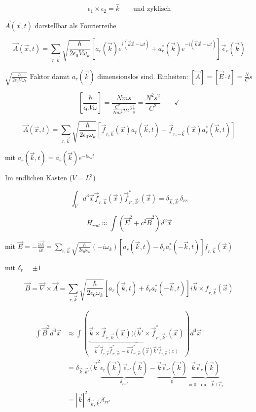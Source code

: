 \[  \epsilon_1  \times \epsilon_2 = \hat k \qquad \text{und zyklisch}\]

\(\vec A(\vec x,t)\) darstellbar als Fourierreihe

\[\vec A(\vec x,t) = \sum_{r,\vec k}\sqrt{ \frac{\hbar}{2\epsilon_0 V\omega_k}}\left[ a_r(\vec k) e^{i(\vec k\vec x-\omega t)} + a_r^*(\vec k) e^{-i(\vec k\vec x-\omega t)}   \right]\vec \epsilon_r(\vec k)  \]

\(\sqrt{ \frac{\hbar}{2\epsilon_0 V\omega_k}}\) Faktor damit \(a_r(\vec k)\) dimensionslos sind. Einheiten: \([\vec A] = [\vec E\cdot t] = \frac{N}{C}s\)

\[[\frac{\hbar}{\epsilon_0 V\omega}] = \frac{Nms}{\frac{C^2}{Nm^2}m^3 \frac{1}{s}} = \frac{N^2s^2}{C^2}\qquad \checkmark\]


\[\vec A(\vec x,t ) = \sum_{r,\vec k} \sqrt{ \frac{\hbar}{2\epsilon_0 \omega_k}} \left[\vec f_{r,\vec k}(\vec x) a_r(\vec k,t)  + \vec f_{r,-\vec k}(\vec x)  a_r^*(\vec k,t)   \right] \]

mit \( a_r(\vec k,t) = a_r(\vec k)e^{-i\omega_k t}  \)

Im endlichen Kasten (\(V=L^3\))

\[\int_V d^3\vec x \vec f_{r,\vec k}(\vec x) \vec f^*_{r',\vec k'}(\vec x) = \delta_{\vec k,\vec k'}\delta_{rs}\]


\[ H_{rad} \approx \int (\vec E ^2 + c^2\vec B^2)d^2\vec x \]

mit \(\vec E = -\frac{\partial \vec A}{\partial t} = \sum_{r,\vec k}\sqrt{\frac{\hbar}{2\epsilon_0\omega_k}}(-i\omega_k)\left[a_r(\vec k,t)  - \delta_r a^*_r(-\vec k,t) \right]f_{r,\vec k}(\vec x)\)

mit \(\delta_r=\pm 1\)

\[\vec B = \vec \nabla\times\vec A = \sum_{r,\vec k}\sqrt{\frac{\hbar}{2\epsilon_0\omega_k}} \left[a_r(\vec k,t)  + \delta_r a^*_r(-\vec k,t) \right]i\vec k\times f_{r,\vec k}(\vec x)   \]


\begin{align}
\int \vec B^2 d^3\vec x &\approx \int(\underbrace{\vec k\times\vec f_{r,\vec k}(\vec x))(\vec k'\times \vec f^*_{r',\vec k'}(\vec x)}_{\vec k^2\vec f_{r,\vec k}\vec f^*_{r',\vec k'}-\vec k\vec f^*_{r',\vec k'}(\vec x)\vec k'\vec f_{r,\vec k}(x)})d^3\vec x\\
&= \delta_{\vec k,\vec k'}(\vec k^2\underbrace{\epsilon_r(\vec k)\vec \epsilon_{r'}(\vec k)  }_{\delta_{r,r'}}- \underbrace{\vec k\vec\epsilon_{r'}(\vec k)}_{0}\underbrace{\vec k\vec \epsilon_r(\vec k)}_{=0 \quad \text{da}\quad \vec k\bot\vec\epsilon_r}\\
&= |\vec k|^2\delta_{\vec k,\vec k'}\delta_{rr'}
\end{align}




